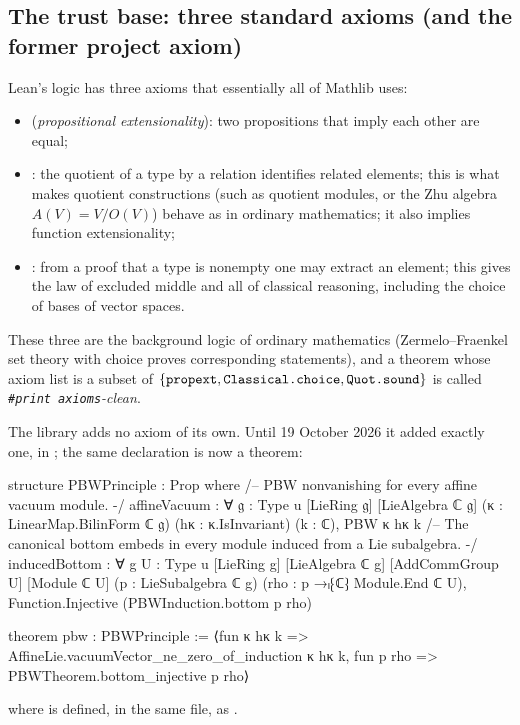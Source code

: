\subsection{The trust base: three standard axioms (and the former project axiom)}\label{ch15:sec:trust}

Lean's logic has three axioms that essentially all of Mathlib uses:
\begin{itemize}
\item {} (\emph{propositional extensionality}): two propositions that imply each other
  are equal;
\item {}: the quotient of a type by a relation identifies related elements; this
  is what makes quotient constructions (such as quotient modules, or the Zhu algebra
  $A(V)=V/O(V)$) behave as in ordinary mathematics; it also implies function extensionality;
\item {}: from a proof that a type is nonempty one may extract an element;
  this gives the law of excluded middle and all of classical reasoning, including the choice of
  bases of vector spaces.
\end{itemize}
These three are the background logic of ordinary mathematics (Zermelo--Fraenkel set theory with
choice proves corresponding statements), and a theorem whose axiom list is a subset of
$\{\lean{propext},\lean{Classical.choice},\lean{Quot.sound}\}$ is called
\emph{\texttt{\#print axioms}-clean}.

The library adds no axiom of its own. Until 19 October 2026 it added exactly one, in
; the same declaration is now a theorem:
\begin{leancode}
structure PBWPrinciple : Prop where
  /-- PBW nonvanishing for every affine vacuum module. -/
  affineVacuum : ∀ {𝔤 : Type u} [LieRing 𝔤] [LieAlgebra ℂ 𝔤]
      (κ : LinearMap.BilinForm ℂ 𝔤) (hκ : κ.IsInvariant) (k : ℂ),
    PBW κ hκ k
  /-- The canonical bottom embeds in every module induced from a Lie subalgebra. -/
  inducedBottom : ∀ {g U : Type u} [LieRing g] [LieAlgebra ℂ g]
      [AddCommGroup U] [Module ℂ U] (p : LieSubalgebra ℂ g)
      (rho : p →ₗ⁅ℂ⁆ Module.End ℂ U),
    Function.Injective (PBWInduction.bottom p rho)

theorem pbw : PBWPrinciple :=
  ⟨fun κ hκ k => AffineLie.vacuumVector_ne_zero_of_induction κ hκ k,
    fun p rho => PBWTheorem.bottom_injective p rho⟩
\end{leancode}
where  is defined, in the same file, as
.

